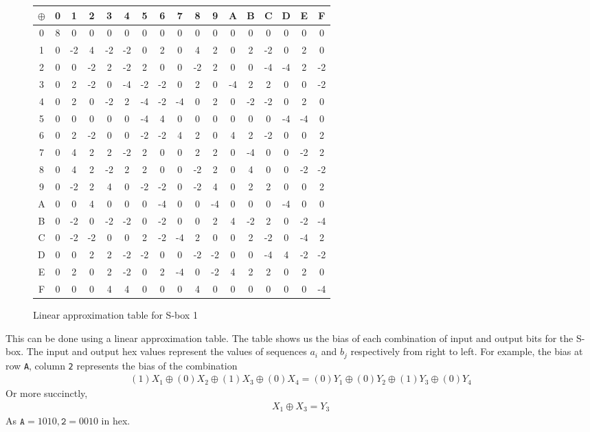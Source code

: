 \documentclass[12pt, a4paper, final]{report}
\begin{document}
\begin{figure}[h]
\begin{center}
\begin{tabular}{c|*{16}{c}}
$\oplus$& 0& 1& 2& 3& 4& 5& 6& 7& 8& 9& A& B& C& D& E& F\\
\midrule
0& 8& 0& 0& 0& 0& 0& 0& 0& 0& 0& 0& 0& 0& 0& 0& 0\\
1& 0&-2& 4&-2&-2& 0& 2& 0& 4& 2& 0& 2&-2& 0& 2& 0\\
2& 0& 0&-2& 2&-2& 2& 0& 0&-2& 2& 0& 0&-4&-4& 2&-2\\
3& 0& 2&-2& 0&-4&-2&-2& 0& 2& 0&-4& 2& 2& 0& 0&-2\\
4& 0& 2& 0&-2& 2&-4&-2&-4& 0& 2& 0&-2&-2& 0& 2& 0\\
5& 0& 0& 0& 0& 0&-4& 4& 0& 0& 0& 0& 0& 0&-4&-4& 0\\
6& 0& 2&-2& 0& 0&-2&-2& 4& 2& 0& 4& 2&-2& 0& 0& 2\\
7& 0& 4& 2& 2&-2& 2& 0& 0& 2& 2& 0&-4& 0& 0&-2& 2\\
8& 0& 4& 2&-2& 2& 2& 0& 0&-2& 2& 0& 4& 0& 0&-2&-2\\
9& 0&-2& 2& 4& 0&-2&-2& 0&-2& 4& 0& 2& 2& 0& 0& 2\\
A& 0& 0& 4& 0& 0& 0&-4& 0& 0&-4& 0& 0& 0&-4& 0& 0\\
B& 0&-2& 0&-2&-2& 0&-2& 0& 0& 2& 4&-2& 2& 0&-2&-4\\
C& 0&-2&-2& 0& 0& 2&-2&-4& 2& 0& 0& 2&-2& 0&-4& 2\\
D& 0& 0& 2& 2&-2&-2& 0& 0&-2&-2& 0& 0&-4& 4&-2&-2\\
E& 0& 2& 0& 2&-2& 0& 2&-4& 0&-2& 4& 2& 2& 0& 2& 0\\
F& 0& 0& 0& 4& 4& 0& 0& 0& 4& 0& 0& 0& 0& 0& 0&-4\\
\end{tabular}
\end{center}
\caption{Linear approximation table for S-box 1}
\end{figure}

This can be done using a linear approximation table. The table shows us the
bias of each combination of input and output bits for the S-box. The input
and output hex values represent the values of sequences $a_i$ and $b_j$
respectively from right to left. For example, the bias at row \texttt{A},
column \texttt{2} represents the bias of the combination
\begin{align*}
    (1)X_1 \oplus (0)X_2 \oplus (1)X_3 \oplus (0)X_4 =
    (0)Y_1 \oplus (0)Y_2 \oplus (1)Y_3 \oplus (0)Y_4
\end{align*}
Or more succinctly,
\begin{align*}
    X_1 \oplus X_3 = Y_3
\end{align*}
As $\texttt{A} = 1010, \texttt{2} = 0010$ in hex.
\end{document}
